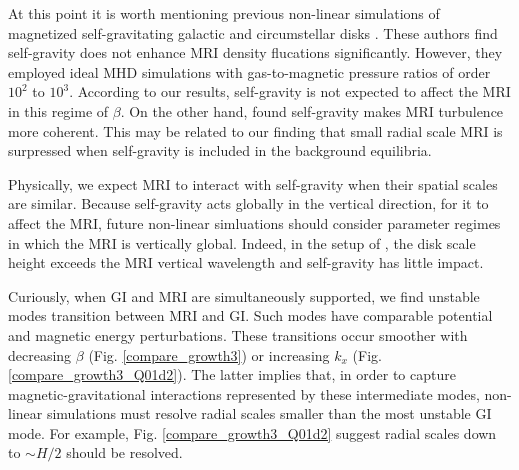 At this point it is worth mentioning previous non-linear simulations
of magnetized self-gravitating galactic and circumstellar disks
\citep{kim03,fromang04a,fromang04}. These authors find self-gravity
does not enhance MRI density flucations significantly. However, they
employed ideal MHD simulations with gas-to-magnetic pressure ratios of
order $10^2$ to $10^3$. According  
to our results, self-gravity is not expected to affect the MRI in this
regime of $\beta$. On the other hand, \cite{fromang04} found
self-gravity makes MRI turbulence more coherent. This may be related
to our finding that small radial scale MRI is surpressed when
self-gravity is included in the background equilibria. 

Physically, we expect MRI to interact with self-gravity when
their spatial scales are similar. Because self-gravity acts globally in the
vertical direction, for it to affect the MRI, future non-linear
simluations should consider parameter regimes in which the MRI is
vertically global. Indeed, in the setup of \cite{kim03}, the disk
scale height exceeds the MRI vertical wavelength and self-gravity has
little impact.   


Curiously, when GI and MRI are simultaneously supported, we find
unstable modes transition between MRI and GI. Such modes
have comparable potential and magnetic energy perturbations. These
transitions occur smoother with decreasing $\beta$
(Fig. \ref{compare_growth3}) or increasing $k_x$
(Fig. \ref{compare_growth3_Q01d2}). The latter implies that, in order
to capture magnetic-gravitational interactions represented by these
intermediate modes, non-linear simulations must resolve radial scales
smaller than the most unstable GI mode. For example, 
Fig. \ref{compare_growth3_Q01d2} suggest radial scales down to $\sim H/2$
should be resolved. 


